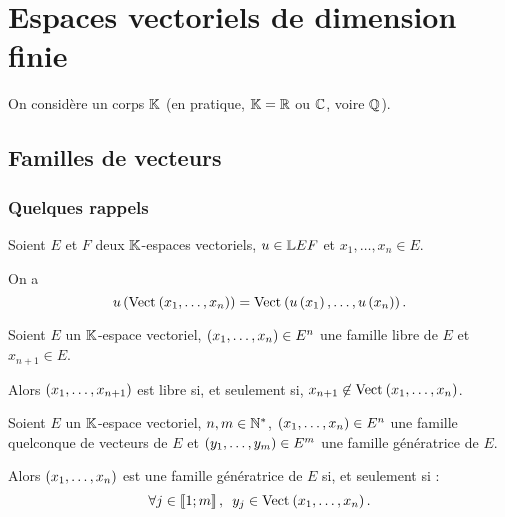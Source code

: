 \chapter{Espaces vectoriels de dimension finie}

\minitoc

On considère un corps \(\mathbb{K}\) (en pratique, \(\mathbb{K}=\mathbb{R}\) ou \(\mathbb{C}\), voire \(\mathbb{Q}\)).

\section{Familles de vecteurs}

\subsection{Quelques rappels}

\begin{rappel}
Soient \(E\) et \(F\) deux \(\mathbb{K}\)-espaces vectoriels, \(u\in\mathbb{L}{E}{F}\) et \(x_1,\dots,x_n\in E\).

On a \[u\paren{\Vect{x_1,\dots,x_n}}=\Vect{u\paren{x_1},\dots,u\paren{x_n}}.\]
\end{rappel}

\begin{rappel}
Soient \(E\) un \(\mathbb{K}\)-espace vectoriel, \(\left(x_1,\dots,x_n\right)\in E^n\) une famille libre de \(E\) et \(x_{n+1}\in E\).

Alors \(\left(x_1,\dots,x_{n+1}\right)\) est libre si, et seulement si, \(x_{n+1}\not\in\Vect{x_1,\dots,x_n}\).
\end{rappel}

\begin{rappel}
Soient \(E\) un \(\mathbb{K}\)-espace vectoriel, \(n,m\in\mathbb{N}^*\), \(\left(x_1,\dots,x_n\right)\in E^n\) une famille quelconque de vecteurs de \(E\) et \(\left(y_1,\dots,y_m\right)\in E^m\) une famille génératrice de \(E\).

Alors \(\left(x_1,\dots,x_n\right)\) est une famille génératrice de \(E\) si, et seulement si : \[\quantifs{\forall j\in\interventierii{1}{m}}y_j\in\Vect{x_1,\dots,x_n}.\]
\end{rappel}

